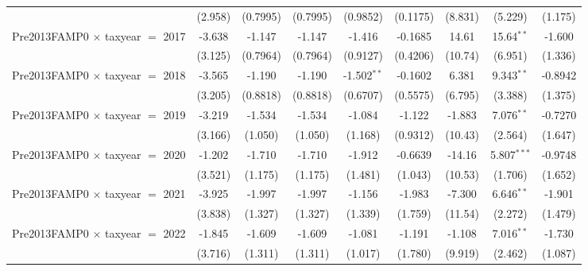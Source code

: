 \begin{tabular}{lcccccccc}
                                           & (2.958)       & (0.7995)      & (0.7995)      & (0.9852)      & (0.1175)       & (8.831)       & (5.229)       & (1.175)\\   
   Pre2013FAMP0 $\times$ taxyear $=$ 2017  & -3.638        & -1.147        & -1.147        & -1.416        & -0.1685        & 14.61         & 15.64$^{**}$  & -1.600\\   
                                           & (3.125)       & (0.7964)      & (0.7964)      & (0.9127)      & (0.4206)       & (10.74)       & (6.951)       & (1.336)\\   
   Pre2013FAMP0 $\times$ taxyear $=$ 2018  & -3.565        & -1.190        & -1.190        & -1.502$^{**}$ & -0.1602        & 6.381         & 9.343$^{**}$  & -0.8942\\   
                                           & (3.205)       & (0.8818)      & (0.8818)      & (0.6707)      & (0.5575)       & (6.795)       & (3.388)       & (1.375)\\   
   Pre2013FAMP0 $\times$ taxyear $=$ 2019  & -3.219        & -1.534        & -1.534        & -1.084        & -1.122         & -1.883        & 7.076$^{**}$  & -0.7270\\   
                                           & (3.166)       & (1.050)       & (1.050)       & (1.168)       & (0.9312)       & (10.43)       & (2.564)       & (1.647)\\   
   Pre2013FAMP0 $\times$ taxyear $=$ 2020  & -1.202        & -1.710        & -1.710        & -1.912        & -0.6639        & -14.16        & 5.807$^{***}$ & -0.9748\\   
                                           & (3.521)       & (1.175)       & (1.175)       & (1.481)       & (1.043)        & (10.53)       & (1.706)       & (1.652)\\   
   Pre2013FAMP0 $\times$ taxyear $=$ 2021  & -3.925        & -1.997        & -1.997        & -1.156        & -1.983         & -7.300        & 6.646$^{**}$  & -1.901\\   
                                           & (3.838)       & (1.327)       & (1.327)       & (1.339)       & (1.759)        & (11.54)       & (2.272)       & (1.479)\\   
   Pre2013FAMP0 $\times$ taxyear $=$ 2022  & -1.845        & -1.609        & -1.609        & -1.081        & -1.191         & -1.108        & 7.016$^{**}$  & -1.730\\   
                                           & (3.716)       & (1.311)       & (1.311)       & (1.017)       & (1.780)        & (9.919)       & (2.462)       & (1.087)\\   

\end{tabular}
